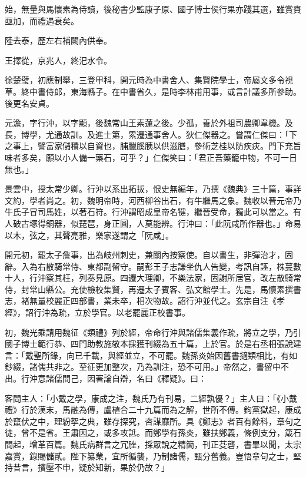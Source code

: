 \begin{pinyinscope}
 始，無量與馬懷素為侍讀，後秘書少監康子原、國子博士侯行果亦踐其選，雖賞賚亟加，而禮遇衰矣。



 陸去泰，歷左右補闕內供奉。



 王擇從，京兆人，終汜水令。



 徐楚璧，初應制舉，三登甲科，開元時為中書舍人、集賢院學士，帝屬文多令視草。終中書侍郎，東海縣子。在中書省久，是時李林甫用事，或言計議多所參助。後更名安貞。



 元澹，字行沖，以字顯，後魏常山王素蓮之後。少孤，養於外祖司農卿韋機。及長，博學，尤通故訓。及進士第，累遷通事舍人。狄仁傑器之。嘗謂仁傑曰：「下之事上，譬富家儲積以自資也，脯臘膎胰以供滋膳，參術芝桂以防疾疢。門下充旨味者多矣，願以小人備一藥石，可乎？」仁傑笑曰：「君正吾藥籠中物，不可一日無也。」



 景雲中，授太常少卿。行沖以系出拓拔，恨史無編年，乃撰《魏典》三十篇，事詳文約，學者尚之。初，魏明帝時，河西柳谷出石，有牛繼馬之象。魏收以晉元帝乃牛氏子冒司馬姓，以著石符。行沖謂昭成皇帝名犍，繼晉受命，獨此可以當之。有人破古塚得銅器，似琵琶，身正圓，人莫能辨。行沖曰：「此阮咸所作器也。」命易以木，弦之，其聲亮雅，樂家遂謂之「阮咸」。



 開元初，罷太子詹事，出為岐州刺史，兼關內按察使。自以書生，非彈治才，固辭。入為右散騎常侍、東都副留守。嗣彭王子志謙坐仇人告變，考訊自誣，株蔓數十人，行沖察其枉，列奏見原。四遷大理卿，不樂法家，固謝所居官，改左散騎常侍，封常山縣公。充使檢校集賢，再遷太子賓客、弘文館學士。先是，馬懷素撰書志，褚無量校麗正四部書，業未卒，相次物故。詔行沖並代之。玄宗自注《孝經》，詔行沖為疏，立於學官。以老罷麗正校書事。



 初，魏光乘請用魏征《類禮》列於經，帝命行沖與諸儒集義作疏，將立之學，乃引國子博士範行恭、四門助教施敬本採獲刊綴為五十篇，上於官。於是右丞相張說建言：「戴聖所錄，向已千載，與經並立，不可罷。魏孫炎始因舊書擿類相比，有如鈔綴，諸儒共非之。至征更加整次，乃為訓注，恐不可用。」帝然之，書留中不出。行沖意諸儒間己，因著論自辯，名曰《釋疑》。曰：



 客問主人：「小戴之學，康成之注，魏氏乃有刊易，二經孰優？」主人曰：「《小戴禮》行於漢末，馬融為傳，盧植合二十九篇而為之解，世所不傳。鉤黨獄起，康成於竄伏之中，理紛挐之典，雖存探究，咨謀靡所。具《鄭志》者百有餘科，章句之徒，曾不是省。王肅因之，或多攻詆。而鄭學有孫炎，雖扶鄭義，條例支分，箴石間起，增革百篇。魏氏病群言之冗脞，採眾說之精簡，刊正芟礱，書畢以聞，太宗嘉賞，錄賜儲貳。陛下纂業，宜所循襲，乃制諸儒，甄分舊義。豈悟章句之士，堅持昔言，擯壓不申，疑於知新，果於仍故？」




\end{pinyinscope}
